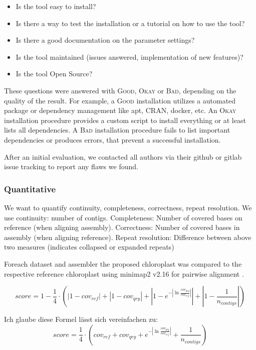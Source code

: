\documentclass{bmcart}
\newcommand{\ok}{\textsc{Okay}}
\newcommand{\bad}{\textsc{Bad}}
\newcommand{\good}{\textsc{Good}}
\begin{document}
\begin{itemize}
    \item Is the tool easy to install? 
    \item Is there a way to test the installation or a tutorial on how to use the tool? 
    \item Is there a good documentation on the parameter settings? 
    \item Is the tool maintained (issues answered, implementation of new features)? 
    \item Is the tool Open Source?
\end{itemize}

These questions were answered with \good{}, \ok{} or \bad{}, depending on the quality of the result. 
For example, a \good{} installation utilizes a automated package or dependency management like apt,
CRAN, docker, etc. An \ok{} installation procedure provides a custom script to install everything
or at least lists all dependencies. A \bad{} installation procedure fails to list important dependencies
or produces errors, that prevent a successful installation. 

After an initial evaluation, we contacted all authors via their github or gitlab issue tracking to
report any flaws we found.

\subsubsection*{Quantitative}
We want to quantify continuity, completeness, correctness, repeat resolution.
We use continuity: number of contigs.
Completeness: Number of covered bases on reference (when aligning assembly).
Correctness: Number of covered bases in assembly (when aligning reference).
Repeat resolution: Difference between above two measures (indicates collapsed or expanded repeats)
%

Foreach dataset and assembler the proposed chloroplast was compared to the respective reference chloroplast using minimap2 v2.16 for pairwise alignment \cite{li2018minimap2}.

\[ score = 1 - \frac{1}{4} \cdot \left( |1- cov_{ref}| +  |1- cov_{qry}| + \left|1- e^{-\left| \ln{\frac{cov_{qry}}{cov_{ref}}}\right|}\right| + \left| 1 - \frac{1}{n_{contigs}} \right| \right) \]

Ich glaube diese Formel lässt sich vereinfachen zu:
\[ score = \frac{1}{4} \cdot \left( cov_{ref} +  cov_{qry} + e^{-\left| \ln{\frac{cov_{qry}}{cov_{ref}}}\right|} + \frac{1}{n_{contigs} }\right) \]
\end{document}
